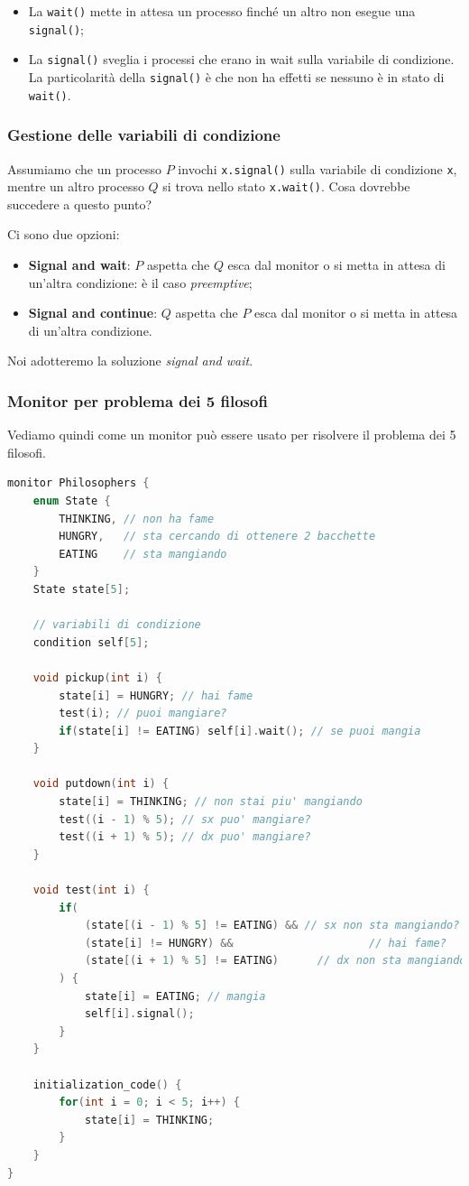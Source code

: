 \documentclass[a4paper,11pt]{article}
\begin{document}
\begin{itemize}
	\item La \lstinline|wait()| mette in attesa un processo finché un altro non esegue una \lstinline|signal()|;
	\item La \lstinline|signal()| sveglia i processi che erano in wait sulla variabile di condizione. La particolarità della \lstinline|signal()| è che non ha effetti se nessuno è in stato di \lstinline|wait()|.
\end{itemize}


\subsubsection{Gestione delle variabili di condizione}
Assumiamo che un processo $P$ invochi \lstinline|x.signal()| sulla variabile di condizione \lstinline|x|, mentre un altro processo $Q$ si trova nello stato \lstinline|x.wait()|. Cosa dovrebbe succedere a questo punto? 

Ci sono due opzioni:
\begin{itemize}
	\item \textbf{Signal and wait}: $P$ aspetta che $Q$ esca dal monitor o si metta in attesa di un'altra condizione: è il caso \textit{preemptive};
	\item \textbf{Signal and continue}: $Q$ aspetta che $P$ esca dal monitor o si metta in attesa di un'altra condizione.
\end{itemize}

Noi adotteremo la soluzione \textit{signal and wait}.

\subsubsection{Monitor per problema dei 5 filosofi}
Vediamo quindi come un monitor può essere usato per risolvere il problema dei 5 filosofi.
\begin{lstlisting}[language=C++, style=codestyle]	
monitor Philosophers {
	enum State {
		THINKING, // non ha fame
		HUNGRY,   // sta cercando di ottenere 2 bacchette
		EATING    // sta mangiando
	}
	State state[5];

	// variabili di condizione
	condition self[5];

	void pickup(int i) {
		state[i] = HUNGRY; // hai fame
		test(i); // puoi mangiare?
		if(state[i] != EATING) self[i].wait(); // se puoi mangia
	}

	void putdown(int i) {
		state[i] = THINKING; // non stai piu' mangiando
		test((i - 1) % 5); // sx puo' mangiare?
		test((i + 1) % 5); // dx puo' mangiare?
	}

	void test(int i) {
		if(
			(state[(i - 1) % 5] != EATING) && // sx non sta mangiando?
			(state[i] != HUNGRY) && 					// hai fame?
			(state[(i + 1) % 5] != EATING)		// dx non sta mangiando?
		) {
			state[i] = EATING; // mangia
			self[i].signal();
		}
	}

	initialization_code() {
		for(int i = 0; i < 5; i++) {
			state[i] = THINKING;
		}
	}
}
\end{lstlisting}
\end{document}
